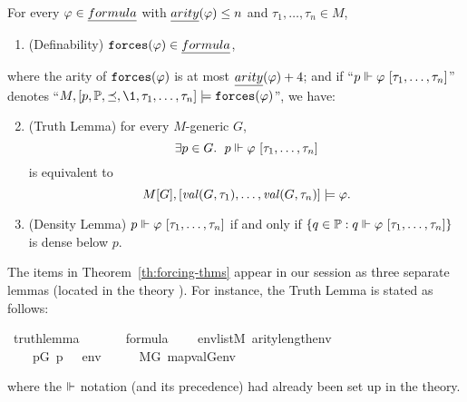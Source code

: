 \begin{theorem}\label{th:forcing-thms}
  For every
  $\phi\in\formula$ with $\isa{arity}(\phi)\leq n$ and $\tau_1,\dots,\tau_n\in M$,
  \begin{enumerate}
  \item\label{item:definability} (Definability)
    $\forceisa(\phi)\in\formula$, 
  \end{enumerate}
  where the 
  arity of $\mathop{\mathtt{forces}}(\varphi)$ is at most $\isa{arity}(\phi) + 4$; and if
  “$p \forces \phi\ [\tau_1,\dots,\tau_n]$”
  denotes
  “$M, [p,\PP,\preceq,\1, \tau_1,\dots,\tau_n]  \models
  \forceisa(\phi)$”, we have:
  \begin{enumerate}
    \setcounter{enumi}{1}
  \item\label{item:truth-lemma} (Truth Lemma) for every $M$-generic $G$,
    \[
      \exists p\in G.\ \; p \forces \phi\ [\tau_1,\dots,\tau_n]
    \]
    is equivalent to 
    \[
      M[G], [\operatorname{\mathit{val}}(G,\tau_1),\dots,\operatorname{\mathit{val}}(G,\tau_n)]
      \models \varphi.
    \]
  \item \label{item:density-lemma} (Density Lemma) $p \forces \phi\ [\tau_1,\dots,\tau_n]$
    if and only if 
    $\{q\in \PP :  q \forces \phi\ [\tau_1,\dots,\tau_n]\}$
    is dense below $p$.
  \end{enumerate}
\end{theorem}
The items in Theorem~\ref{th:forcing-thms} appear in our
 session \cite{Independence_CH-AFP} as three
separate lemmas (located in the theory
).
For instance, the Truth Lemma is stated as
follows:
\begin{isabelle}
\isamarkupfalse%
\ truth{\isacharunderscore}{\kern0pt}lemma{\isacharcolon}{\kern0pt}\isanewline
\ \ \isanewline
\ \ \ \ {\isachardoublequoteopen}{\isasymphi}{\isasymin}formula{\isachardoublequoteclose}\isanewline
\ \ \ \ {\isachardoublequoteopen}env{\isasymin}list{\isacharparenleft}{\kern0pt}M{\isacharparenright}{\kern0pt}{\isachardoublequoteclose}\ {\isachardoublequoteopen}arity{\isacharparenleft}{\kern0pt}{\isasymphi}{\isacharparenright}{\kern0pt}{\isasymle}length{\isacharparenleft}{\kern0pt}env{\isacharparenright}{\kern0pt}{\isachardoublequoteclose}\isanewline
\ \ \isanewline
\ \ \ \ {\isachardoublequoteopen}{\isacharparenleft}{\kern0pt}{\isasymexists}p{\isasymin}G{\isachardot}{\kern0pt}\ p\ {\isasymtturnstile}\ {\isasymphi}\ env{\isacharparenright}{\kern0pt}\ \ \ {\isasymlongleftrightarrow}\ \ \ M{\isacharbrackleft}{\kern0pt}G{\isacharbrackright}{\kern0pt}{\isacharcomma}{\kern0pt}\ map{\isacharparenleft}{\kern0pt}val{\isacharparenleft}{\kern0pt}G{\isacharparenright}{\kern0pt}{\isacharcomma}{\kern0pt}env{\isacharparenright}{\kern0pt}\ {\isasymTurnstile}\ {\isasymphi}{\isachardoublequoteclose}
\end{isabelle}
where the $\Vdash$ notation (and its precedence) had already been set up in the
 theory.

